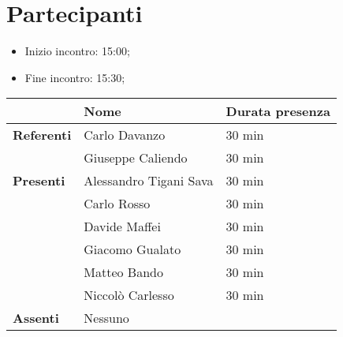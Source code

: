 \section{Partecipanti}

\begin{itemize}
    \item Inizio incontro: 15:00;
	\item Fine incontro: 15:30;
\end{itemize}


\begin{center}
{\renewcommand{\arraystretch}{1.5}
\begin{tabular}{l|ll}
	                    & \textbf{Nome}  			& \textbf{Durata presenza} 	\\
	\hline 
	\textbf{Referenti} 	& Carlo Davanzo 			& 30 min	\\
						& Giuseppe Caliendo 		& 30 min 	\\
	\hline
	\textbf{Presenti}   & Alessandro Tigani Sava    & 30 min 	\\   
		  				& Carlo Rosso           	& 30 min 	\\   
						& Davide Maffei          	& 30 min 	\\   
						& Giacomo Gualato           & 30 min 	\\        
						& Matteo Bando        		& 30 min 	\\       
						& Niccolò Carlesso       	& 30 min 	\\   
	\hline
	\textbf{Assenti}	& Nessuno    				&	        \\
\end{tabular}	
}
\end{center}
